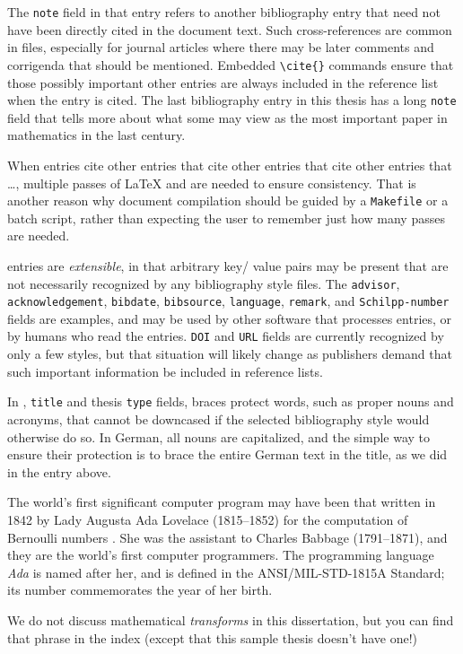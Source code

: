 The \texttt{note} field in that entry refers to another bibliography
entry that need not have been directly cited in the document text.
Such cross-references are common in \BibTeX{} files, especially for
journal articles where there may be later comments and corrigenda that
should be mentioned.  Embedded \verb=\cite{}= commands ensure that
those possibly important other entries are always included in the
reference list when the entry is cited.  The last bibliography entry
\cite{Wiles:1995:MEC} in this thesis has a long \texttt{note} field
that tells more about what some may view as the most important paper
in mathematics in the last century.

When entries cite other entries that cite other entries that cite
other entries that \ldots{}, multiple passes of \LaTeX{} and \BibTeX{}
are needed to ensure consistency.  That is another reason why document
compilation should be guided by a \texttt{Makefile} or a batch script,
rather than expecting the user to remember just how many passes are
needed.

\BibTeX{} entries are \emph{extensible}, in that arbitrary key\slash
value pairs may be present that are not necessarily recognized by any
bibliography style files.  The \texttt{advisor},
\texttt{acknowledgement}, \texttt{bibdate}, \texttt{bibsource},
\texttt{language}, \texttt{remark}, and \texttt{Schilpp-number} fields
are examples, and may be used by other software that processes
\BibTeX{} entries, or by humans who read the entries.  \texttt{DOI}
and \texttt{URL} fields are currently recognized by only a few styles,
but that situation will likely change as publishers demand that such
important information be included in reference lists.

In \BibTeX{}, \texttt{title} and thesis \texttt{type} 
fields, braces protect words, such as
proper nouns and acro\-nyms, that cannot be downcased if the selected
bibliography style would otherwise do so.  In German, all nouns are
capitalized, and the simple way to ensure their protection is to brace
the entire German text in the title, as we did in the entry above.

The world's first significant computer program may
have been that written in 1842 by Lady Augusta Ada
Lovelace (1815--1852) for the computation of Bernoulli
numbers \cite{Huskey:1980:LLC,Kim:1999:AFC}.  She
was the assistant to Charles Babbage
(1791--1871), and they are the world's first
computer programmers. The programming language
\emph{Ada} is named after her, and is defined in
the ANSI/MIL-STD-1815A Standard; its number
commemorates the year of her birth.

We do not discuss mathematical \emph{transforms}
in this dissertation, but you can find that phrase
in the index (except that this sample thesis doesn't have one!)

\blah

\blah
\blah

\blah
